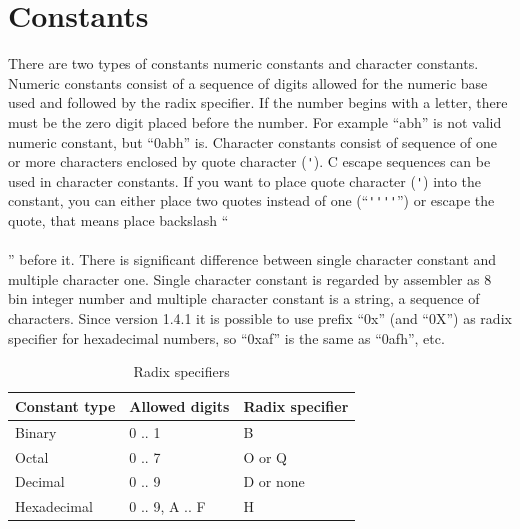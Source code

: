 \documentclass[a4paper,twoside,12pt]{book}
\newcommand{\mysmallfont}{\fontsize{8pt}{10pt} \selectfont{}}
\begin{document}
	\section{Constants}
		There are two types of constants numeric constants and character constants. Numeric constants consist of a sequence of digits allowed for the numeric base used and followed by the radix specifier. If the number begins with a letter, there must be the zero digit placed before the number. For example ``abh'' is not valid numeric constant, but ``0abh'' is. Character constants consist of sequence of one or more characters enclosed by quote character (\verb"'"). C escape sequences can be used in character constants. If you want to place quote character (\verb"'") into the constant, you can either place two quotes instead of one (``\verb"''''"'') or escape the quote, that means place backslash ``\\\\'' before it. There is significant difference between single character constant and multiple character one. Single character constant is regarded by assembler as 8 bin integer number and multiple character constant is a string, a sequence of characters. Since version 1.4.1 it is possible to use prefix ``0x'' (and
``0X'') as radix specifier for hexadecimal numbers, so ``0xaf'' is the same as ``0afh'', etc.

		\begin{table}[h!]
			\mysmallfont{}
			\centering{}
			\begin{tabular}{|l|l|l|}
				\hline
				Constant type	& Allowed digits	& Radix specifier	\\
				\hline
				Binary		& 0 .. 1		& B		\\
				Octal		& 0 .. 7		& O or Q	\\
				Decimal		& 0 .. 9		& D or none	\\
				Hexadecimal	& 0 .. 9, A .. F	& H		\\
				\hline
			\end{tabular}
			\caption{Radix specifiers}
		\end{table}
\end{document}
